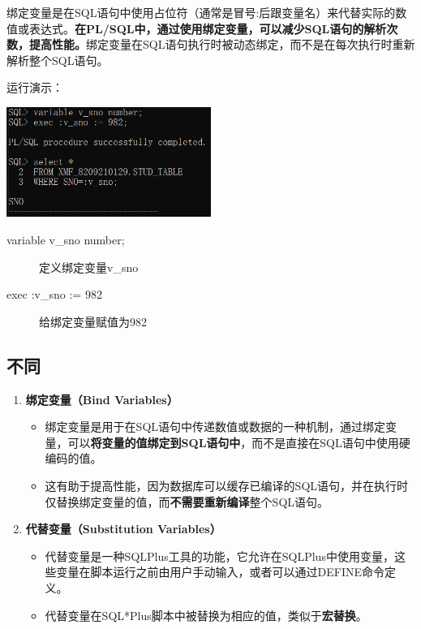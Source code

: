 \documentclass[11pt, a4paper, oneside, UTF8]{ctexbook}
\let\kaishu\relax %
\begin{document}
绑定变量是在SQL语句中使用占位符（通常是冒号:后跟变量名）来代替实际的数值或表达式。{\bfseries\kaishu 在PL/SQL中，通过使用绑定变量，可以减少SQL语句的解析次数，提高性能。}绑定变量在SQL语句执行时被动态绑定，而不是在每次执行时重新解析整个SQL语句。

运行演示：
\begin{center}
  \begin{minipage}{\textwidth}
    \center
    \includegraphics[width=0.5\textwidth]{picture/绑定变量效果.png}
    \captionsetup{hypcap=false}
    \label{fig:绑定变量效果}
  \end{minipage}
\end{center}
\begin{description}
  \item[variable v\_sno number;] 定义绑定变量v\_sno
  \item[exec :v\_sno := 982] 给绑定变量赋值为982
\end{description}

\subsection{不同}

\begin{enumerate}
  \item {\bfseries\kaishu 绑定变量（Bind Variables）}
  \begin{itemize}
    \item 绑定变量是用于在SQL语句中传递数值或数据的一种机制，通过绑定变量，可以\textbf{将变量的值绑定到SQL语句中}，而不是直接在SQL语句中使用硬编码的值。
    \item 这有助于提高性能，因为数据库可以缓存已编译的SQL语句，并在执行时仅替换绑定变量的值，而\textbf{不需要重新编译}整个SQL语句。
  \end{itemize}
  \item {\bfseries\kaishu 代替变量（Substitution Variables）}
  \begin{itemize}
    \item 代替变量是一种SQLPlus工具的功能，它允许在SQLPlus中使用变量，这些变量在脚本运行之前由用户手动输入，或者可以通过DEFINE命令定义。
    \item 代替变量在SQL*Plus脚本中被替换为相应的值，类似于\textbf{宏替换}。
  \end{itemize}
\end{enumerate}
\end{document}
